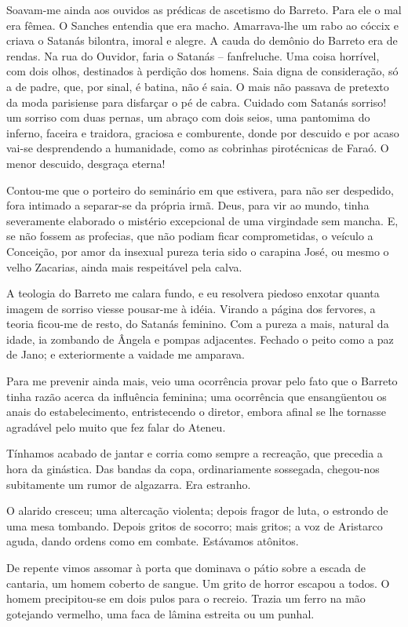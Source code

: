 Soavam{}-me ainda aos ouvidos as prédicas de
ascetismo do Barreto. Para ele o mal era fêmea. O Sanches entendia que
era macho. Amarrava{}-lhe um rabo ao cóccix e criava o Satanás
bilontra, imoral e alegre. A cauda do demônio do Barreto era de rendas.
Na rua do Ouvidor, faria o Satanás -- fanfreluche. Uma coisa horrível, com
dois olhos, destinados à perdição dos homens. Saia digna de
consideração, só a de padre, que, por sinal, é batina, não é saia. O
mais não passava de pretexto da moda parisiense para disfarçar o pé de
cabra. Cuidado com Satanás sorriso! um sorriso com duas pernas, um
abraço com dois seios, uma pantomima do inferno, faceira e traidora,
graciosa e comburente, donde por descuido e por acaso vai{}-se
desprendendo a humanidade, como as cobrinhas pirotécnicas de Faraó. O
menor descuido, desgraça eterna! 

Contou{}-me que o porteiro do
seminário em que estivera, para não ser despedido, fora intimado a
separar{}-se da própria irmã. Deus, para vir ao mundo, tinha
severamente elaborado o mistério excepcional de uma virgindade sem
mancha. E, se não fossem as profecias, que não podiam ficar
comprometidas, o veículo a Conceição, por amor da insexual pureza teria
sido o carapina José, ou mesmo o velho Zacarias, ainda mais respeitável
pela calva. 

A teologia do Barreto me calara fundo, e eu resolvera
piedoso enxotar quanta imagem de sorriso viesse pousar{}-me à idéia.
Virando a página dos fervores, a teoria ficou{}-me de resto, do Satanás
feminino. Com a pureza a mais, natural da idade, ia zombando de Ângela
e pompas adjacentes. Fechado o peito como a paz de Jano; e
exteriormente a vaidade me amparava. 

Para me prevenir ainda mais, veio
uma ocorrência provar pelo fato que o Barreto tinha razão acerca da
influência feminina; uma ocorrência que ensangüentou os anais do
estabelecimento, entristecendo o diretor, embora afinal se lhe tornasse
agradável pelo muito que fez falar do Ateneu. 

Tínhamos acabado de
jantar e corria como sempre a recreação, que precedia a hora da
ginástica. Das bandas da copa, ordinariamente sossegada, chegou{}-nos
subitamente um rumor de algazarra. Era estranho. 

O alarido cresceu; uma
altercação violenta; depois fragor de luta, o estrondo de uma mesa
tombando. Depois gritos de socorro; mais gritos; a voz de Aristarco
aguda, dando ordens como em combate. Estávamos atônitos. 

De repente vimos assomar à porta que dominava o pátio sobre a escada de cantaria,
um homem coberto de sangue. Um grito de horror escapou a todos. O homem
precipitou{}-se em dois pulos para o recreio. Trazia um ferro na mão
gotejando vermelho, uma faca de lâmina estreita ou um punhal. 

